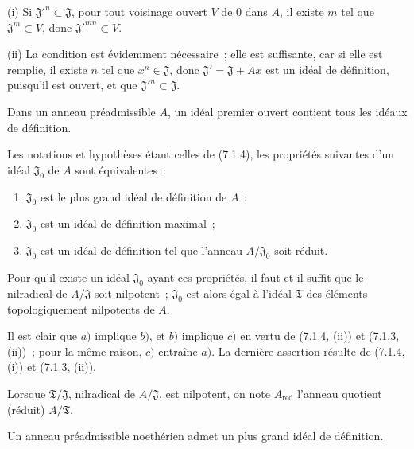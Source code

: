 (i) Si ${\mathfrak J'}^n\subset\mathfrak J$, pour tout voisinage ouvert $V$ de
$0$ dans $A$, il existe $m$ tel que $\mathfrak J^m\subset V$, donc
${\mathfrak J'}^{mn}\subset V$.

(ii) La condition est évidemment nécessaire~; elle est suffisante, car si elle
est remplie, il existe $n$ tel que $x^n\in\mathfrak J$, donc
$\mathfrak J'=\mathfrak J+Ax$ est un idéal de définition, puisqu'il est ouvert,
et que ${\mathfrak J'}^n\subset\mathfrak J$.

\begin{corollary}[7.1.5]
\label{0.7.1.5-fr}
Dans un anneau préadmissible $A$, un idéal premier ouvert contient tous les
idéaux de définition.
\end{corollary}

\begin{corollary}[7.1.6]
\label{0.7.1.6-fr}
Les notations et hypothèses étant celles de (7.1.4), les propriétés suivantes
d'un idéal $\mathfrak J_0$ de $A$ sont équivalentes~:
\begin{enumerate}
  \item[$a)$] $\mathfrak J_0$ est le plus grand idéal de définition de $A$~;
  \item[$b)$] $\mathfrak J_0$ est un idéal de définition maximal~;
  \item[$c)$] $\mathfrak J_0$ est un idéal de définition tel que l'anneau
    $A/\mathfrak J_0$ soit réduit.
\end{enumerate}
Pour qu'il existe un idéal $\mathfrak J_0$ ayant ces propriétés, il faut et il
suffit que le nilradical de $A/\mathfrak J$ soit nilpotent~; $\mathfrak J_0$
est alors égal à l'idéal $\mathfrak T$ des éléments topologiquement nilpotents
de $A$.
\end{corollary}

Il est clair que $a)$ implique $b)$, et $b)$ implique $c)$ en vertu de
(7.1.4, (ii)) et (7.1.3, (ii))~; pour la même raison, $c)$ entraîne $a)$. La
dernière assertion résulte de (7.1.4, (i)) et (7.1.3, (ii)).

Lorsque $\mathfrak T/\mathfrak J$, nilradical de $A/\mathfrak J$, est
nilpotent, on note $A_{\mathrm{red}}$ l'anneau quotient (réduit)
$A/\mathfrak T$.


\begin{corollary}[7.1.7]
\label{0.7.1.7-fr}
Un anneau préadmissible noethérien admet un plus grand idéal de définition.
\end{corollary}

